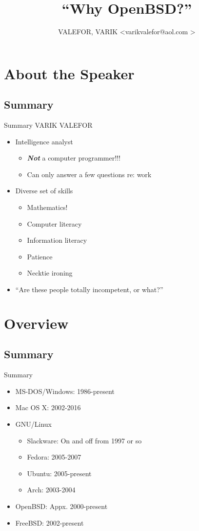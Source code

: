 \documentclass{beamer}
\title{``Why OpenBSD?''}
\author[VALEFOR, VARIK]{VALEFOR, VARIK \textless varikvalefor@aol.com \!\!\textgreater}
\begin{document}
	\maketitle
	\section{About the Speaker}
		\subsection{Summary}
			\begin{frame}{Summary}
				VARIK VALEFOR
				\begin{itemize}
					\item Intelligence analyst
					\begin{itemize}
						\item \textbf{\textit{Not}} a computer programmer!!!
						\item Can only answer a few questions re: work
					\end{itemize}
					\item Diverse set of skills
					\begin{itemize}
						\item Mathematics!
						\item Computer literacy
						\item Information literacy
						\item Patience
						\item Necktie ironing			
						\end{itemize}
					\item ``Are these people totally incompetent, or what?''
				\end{itemize}
			\end{frame}
	\section{Overview}
		\subsection{Summary}
			\begin{frame}{Summary}
				\begin{itemize}
					\item MS-DOS/Windows: 1986-present
					\item Mac OS X: 2002-2016
					\item GNU/Linux
					\begin{itemize}
						\item Slackware: On and off from 1997 or so
						\item Fedora: 2005-2007
						\item Ubuntu: 2005-present
						\item Arch: 2003-2004
					\end{itemize}
					\item OpenBSD: Appx. 2000-present
					\item FreeBSD: 2002-present
				\end{itemize}
			\end{frame}
\end{document}
